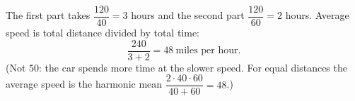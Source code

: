 The first part takes $\dfrac{120}{40}=3$ hours and the second part $\dfrac{120}{60}=2$ hours. Average speed is total distance divided by total time:
\[\dfrac{240}{3+2}=\boxed{48}\ \text{miles per hour}.\]
(Not $50$: the car spends more time at the slower speed. For equal distances the average speed is the harmonic mean $\dfrac{2\cdot40\cdot60}{40+60}=48$.)
